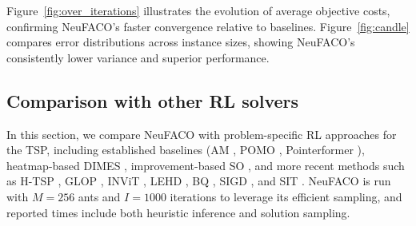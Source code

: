 \documentclass[a4paper,conference]{IEEEtran}
\begin{document}
Figure~\ref{fig:over_iterations} illustrates the evolution of average objective costs, confirming NeuFACO’s faster convergence relative to baselines. Figure~\ref{fig:candle} compares error distributions across instance sizes, showing NeuFACO’s consistently lower variance and superior performance.  


\subsection{Comparison with other RL solvers}
In this section, we compare NeuFACO with problem-specific RL approaches for the TSP, including established baselines (AM \cite{transformer}, POMO \cite{pomo}, Pointerformer \cite{pointerformer}), heatmap-based DIMES \cite{dimes}, improvement-based SO \cite{SelectAndOptimize}, and more recent methods such as H-TSP \cite{htsp}, GLOP \cite{glop}, INViT \cite{invit}, LEHD \cite{lehd}, BQ \cite{bq}, SIGD \cite{sigd}, and SIT \cite{sit}. NeuFACO is run with $M=256$ ants and $I=1000$ iterations to leverage its efficient sampling, and reported times include both heuristic inference and solution sampling.

\end{document}
